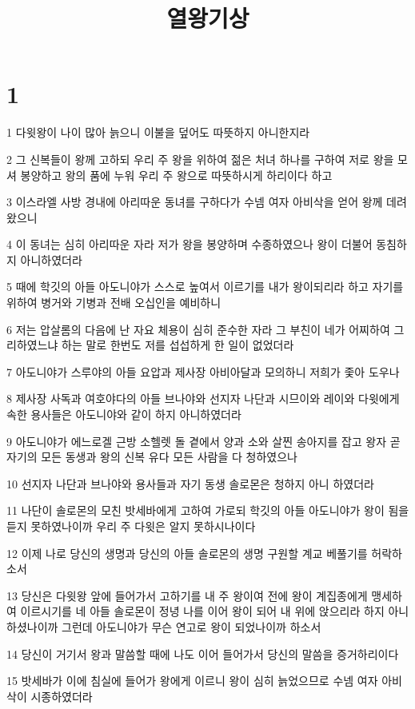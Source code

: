 

\title{열왕기상}


\chapter{1}

\par 1 다윗왕이 나이 많아 늙으니 이불을 덮어도 따뜻하지 아니한지라
\par 2 그 신복들이 왕께 고하되 우리 주 왕을 위하여 젊은 처녀 하나를 구하여 저로 왕을 모셔 봉양하고 왕의 품에 누워 우리 주 왕으로 따뜻하시게 하리이다 하고
\par 3 이스라엘 사방 경내에 아리따운 동녀를 구하다가 수넴 여자 아비삭을 얻어 왕께 데려 왔으니
\par 4 이 동녀는 심히 아리따운 자라 저가 왕을 봉양하며 수종하였으나 왕이 더불어 동침하지 아니하였더라
\par 5 때에 학깃의 아들 아도니야가 스스로 높여서 이르기를 내가 왕이되리라 하고 자기를 위하여 병거와 기병과 전배 오십인을 예비하니
\par 6 저는 압살롬의 다음에 난 자요 체용이 심히 준수한 자라 그 부친이 네가 어찌하여 그리하였느냐 하는 말로 한번도 저를 섭섭하게 한 일이 없었더라
\par 7 아도니야가 스루야의 아들 요압과 제사장 아비아달과 모의하니 저희가 좇아 도우나
\par 8 제사장 사독과 여호야다의 아들 브나야와 선지자 나단과 시므이와 레이와 다윗에게 속한 용사들은 아도니야와 같이 하지 아니하였더라
\par 9 아도니야가 에느로겔 근방 소헬렛 돌 곁에서 양과 소와 살찐 송아지를 잡고 왕자 곧 자기의 모든 동생과 왕의 신복 유다 모든 사람을 다 청하였으나
\par 10 선지자 나단과 브나야와 용사들과 자기 동생 솔로몬은 청하지 아니 하였더라
\par 11 나단이 솔로몬의 모친 밧세바에게 고하여 가로되 학깃의 아들 아도니야가 왕이 됨을 듣지 못하였나이까 우리 주 다윗은 알지 못하시나이다
\par 12 이제 나로 당신의 생명과 당신의 아들 솔로몬의 생명 구원할 계교 베풀기를 허락하소서
\par 13 당신은 다윗왕 앞에 들어가서 고하기를 내 주 왕이여 전에 왕이 계집종에게 맹세하여 이르시기를 네 아들 솔로몬이 정녕 나를 이어 왕이 되어 내 위에 앉으리라 하지 아니하셨나이까 그런데 아도니야가 무슨 연고로 왕이 되었나이까 하소서
\par 14 당신이 거기서 왕과 말씀할 때에 나도 이어 들어가서 당신의 말씀을 증거하리이다
\par 15 밧세바가 이에 침실에 들어가 왕에게 이르니 왕이 심히 늙었으므로 수넴 여자 아비삭이 시종하였더라
